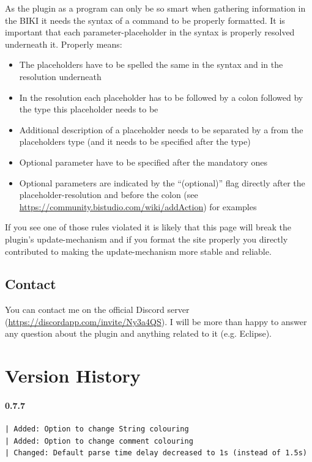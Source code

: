 \documentclass[twoside=false]{scrbook}
\newcommand{\eclipse}{Eclipse\xspace}
\begin{document}
	As the plugin as a program can only be so smart when gathering information in the BIKI it needs the syntax of a command to be properly formatted. It is important that each parameter-placeholder in the syntax is properly resolved underneath it. Properly means:
	\begin{itemize}
		\item The placeholders have to be spelled the same in the syntax and in the resolution underneath
		\item In the resolution each placeholder has to be followed by a colon followed by the type this placeholder needs to be
		\item Additional description of a placeholder needs to be separated by a \keys{-} from the placeholders type (and it needs to be specified after the type)
		\item Optional parameter have to be specified after the mandatory ones
		\item Optional parameters are indicated by the “(optional)” flag directly after the placeholder-resolution and before the colon (see \url{https://community.bistudio.com/wiki/addAction}) for examples
	\end{itemize}
	
	If you see one of those rules violated it is likely that this page will break the plugin's update-mechanism and if you format the site properly you directly contributed to making the update-mechanism more stable and reliable.

	
	\section{Contact}
	\label{sec:Contact}
	You can contact me on the official Discord server (\url{https://discordapp.com/invite/Ny3a4QS}). I will be more than happy to answer any question about the plugin and anything related to it (e.g. \eclipse).
	
	
	
	\chapter{Version History}
	\label{ch:VersionHistory}
	
	\subsubsection*{0.7.7}
	\begin{lstlisting}[breaklines=true]
| Added: Option to change String colouring
| Added: Option to change comment colouring
| Changed: Default parse time delay decreased to 1s (instead of 1.5s)
	\end{lstlisting}
	
\end{document}
